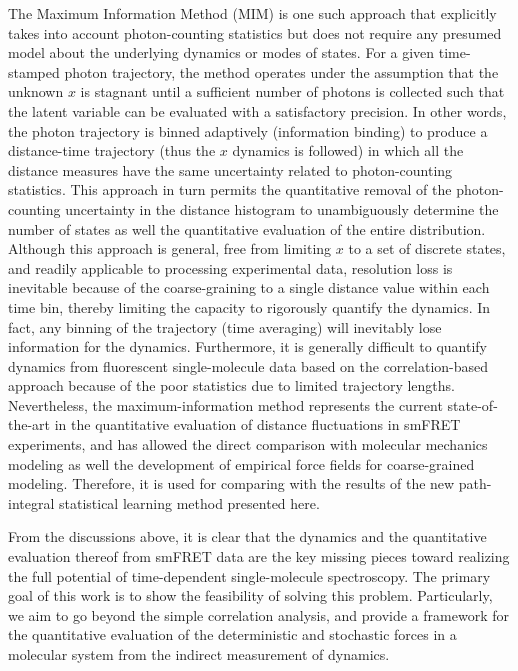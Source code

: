 \documentclass[journal=jpcbfk,manuscript=article,layout=twocolumn,articletitle=true]{achemso}
\begin{document}
The Maximum Information Method (MIM) is one such approach that explicitly takes into account photon-counting statistics but does not require any presumed model about the underlying dynamics or modes of states.\cite{Watkins:2004cia} For a given time-stamped photon trajectory, the method operates under the assumption that the unknown $x$ is stagnant until a sufficient number of photons is collected such that the latent variable can be evaluated with a satisfactory precision. In other words, the photon trajectory is binned adaptively (information binding) to produce a distance-time trajectory (thus the $x$ dynamics is followed) in which all the distance measures have the same uncertainty related to photon-counting statistics. This approach in turn permits the quantitative removal of the photon-counting uncertainty in the distance histogram to unambiguously determine the number of states as well the quantitative evaluation of the entire distribution.\cite{Watkins:2006bu} Although this approach is general, free from limiting $x$ to a set of discrete states, and readily applicable to processing experimental data,\cite{Hanson:2007fga,Flynn:2010jpa} resolution loss is inevitable because of the coarse-graining to a single distance value within each time bin, thereby limiting the capacity to rigorously quantify the dynamics. In fact, any binning of the trajectory (time averaging) will inevitably lose information for the dynamics. Furthermore, it is generally difficult to quantify dynamics from fluorescent single-molecule data based on the correlation-based approach because of the poor statistics due to limited trajectory lengths.\cite{Hanson_Yang_2008,HansonJPCB2008} Nevertheless, the maximum-information method represents the current state-of-the-art in the quantitative evaluation of distance fluctuations in smFRET experiments, and has allowed the direct comparison with molecular mechanics modeling\cite{Hanson:2011ui} as well the development of empirical force fields for coarse-grained modeling.\cite{Wang_Wang_JCTC_2013} Therefore, it is used for comparing with the results of the new path-integral statistical learning method presented here.

From the discussions above, it is clear that the dynamics and the quantitative evaluation thereof from smFRET data are the key missing pieces toward realizing the full potential of time-dependent single-molecule spectroscopy. The primary goal of this work is to show the feasibility of solving this problem. Particularly, we aim to go beyond the simple correlation analysis, and provide a framework for the quantitative evaluation of the deterministic and stochastic forces in a molecular system from the indirect measurement of dynamics. 
\end{document}

